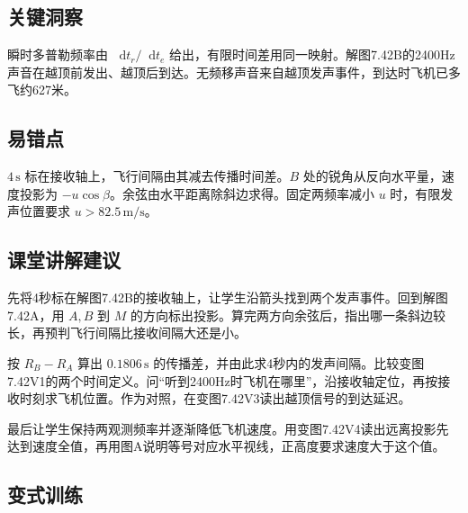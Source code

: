 \documentclass[UTF8,fontset=fandol,a4paper,11pt]{ctexart}
\newcommand{\dd}{\mathop{}\!\mathrm{d}}
\begin{document}
\subsection*{关键洞察}

瞬时多普勒频率由 $\dd t_r/\dd t_e$ 给出，有限时间差用同一映射。解图7.42B的2400Hz声音在越顶前发出、越顶后到达。无频移声音来自越顶发声事件，到达时飞机已多飞约627米。




\subsection*{易错点}

$4\,\mathrm s$ 标在接收轴上，飞行间隔由其减去传播时间差。$B$ 处的锐角从反向水平量，速度投影为 $-u\cos\beta$。余弦由水平距离除斜边求得。固定两频率减小 $u$ 时，有限发声位置要求 $u>82.5\,\mathrm{m/s}$。




\subsection*{课堂讲解建议}

先将4秒标在解图7.42B的接收轴上，让学生沿箭头找到两个发声事件。回到解图7.42A，用 $A,B$ 到 $M$ 的方向标出投影。算完两方向余弦后，指出哪一条斜边较长，再预判飞行间隔比接收间隔大还是小。

按 $R_B-R_A$ 算出 $0.1806\,\mathrm s$ 的传播差，并由此求4秒内的发声间隔。比较变图7.42V1的两个时间定义。问“听到2400Hz时飞机在哪里”，沿接收轴定位，再按接收时刻求飞机位置。作为对照，在变图7.42V3读出越顶信号的到达延迟。

最后让学生保持两观测频率并逐渐降低飞机速度。用变图7.42V4读出远离投影先达到速度全值，再用图A说明等号对应水平视线，正高度要求速度大于这个值。




\subsection*{变式训练}
\end{document}
